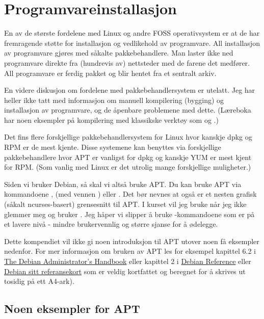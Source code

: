 \chapter{Programvareinstallasjon}

En av de største fordelene med Linux og andre FOSS operativsystem er at de
har fremragende støtte for installasjon og vedlikehold av programvare. 
All installasjon av programvare gjøres med såkalte pakkebehandlere. Man laster ikke
ned programvare direkte fra (hundrevis av) nettsteder med de farene det medfører.
All programvare er ferdig pakket og blir hentet fra et sentralt arkiv. 

En videre diskusjon om fordelene med pakkebehandlersystem er utelatt. Jeg har heller 
ikke tatt med informasjon om manuell kompilering (bygging) og installasjon av programvare,
og de åpenbare problemene med dette. (Læreboka har noen eksempler på kompilering med
klassikske verktøy som  og .)

Det fins flere forskjellige pakkebehandlersystem for Linux hvor kanskje dpkg og 
RPM er de mest kjente. Disse systemene kan benyttes via forskjellige pakkebehandlere
hvor APT er vanligst for dpkg og kanskje YUM er mest kjent for RPM. (Som vanlig med 
Linux er det utrolig mange forskjellige muligheter.)

Siden vi bruker Debian, så skal vi altså bruke APT. 
Du kan bruke APT via kommandoene ,
 (med vennen ) 
eller . Det bør nevnes at 
 også er et nesten grafisk (såkalt ncurses-basert) grensesnitt til APT.
I kurset vil jeg bruke  når jeg ikke glemmer meg og bruker .
Jeg håper vi slipper å bruke -kommandoene som er på et lavere nivå - mindre 
brukervennlig og større sjanse for å ødelegge.

Dette kompendiet vil ikke gi noen introduksjon til APT utover noen få eksempler nedenfor.
For mer informasjon om bruken av APT les for eksempel kapittel 6.2 i 
\href{https://debian-handbook.info/browse/stable/}{The Debian Administrator's Handbook} eller 
kapittel 2 i 
\href{https://www.debian.org/doc/manuals/debian-reference/}{Debian Reference} eller 
\href{https://www.debian.org/doc/manuals/refcard/refcard}{Debian sitt referansekort} som 
er veldig kortfattet og beregnet for å skrives ut tosidig på ett A4-ark).

\section{Noen eksempler for APT}

